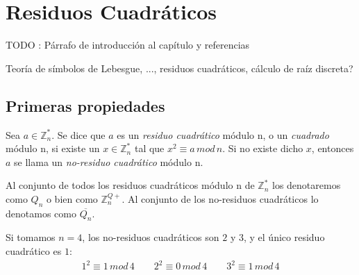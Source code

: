 \chapter{Residuos Cuadráticos}\label{ch:qr} 

TODO : Párrafo de introducción al capítulo y referencias


Teoría de símbolos de Lebesgue, ..., residuos cuadráticos, cálculo de raíz discreta?





\section{Primeras propiedades}


\begin{definition}
	Sea $a\in \mathbb{Z}^*_n$. Se dice que $a$ es un \textit{residuo cuadrático} módulo n, o un \textit{cuadrado} módulo n, si existe un $x \in \mathbb{Z}^*_n$ tal que $x^2 \equiv a \, mod \, n$.
	Si no existe dicho $x$, entonces $a$ se llama un \textit{no-residuo cuadrático} módulo n.
	
	Al conjunto de todos los residuos cuadráticos módulo n de $\mathbb{Z}^*_n$ los denotaremos como $Q_n$ o bien como $\mathbb{Z}^{Q+}_n$.
	Al conjunto de los no-residuos cuadráticos lo denotamos como $\overline{Q_n}$.
\end{definition}

\begin{example}
	Si tomamos $n=4$, los no-residuos cuadráticos son $2$ y $3$, y el único residuo cuadrático es $1$:
	\begin{align*}
		1^2 \equiv 1 \, mod \, 4 \qquad 2^2 \equiv 0 \, mod \, 4 \qquad  3^2 \equiv 1 \, mod \, 4 
	\end{align*}
	
\end{example}


